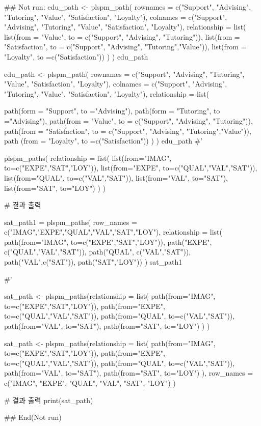 \documentclass[a4paper]{book}
\begin{document}
\begin{Examples}
\begin{ExampleCode}

## Not run: 
edu_path <- plspm_path(
  rownames = c("Support", "Advising", "Tutoring", "Value", "Satisfaction", "Loyalty"),
  colnames = c("Support", "Advising", "Tutoring", "Value", "Satisfaction", "Loyalty"),
  relationship = list(
    list(from = "Value",
         to = c("Support", "Advising", "Tutoring")),
    list(from = "Satisfaction",
         to = c("Support", "Advising", "Tutoring","Value")),
    list(from = "Loyalty",
         to =c("Satisfaction"))
  )
)
edu_path


edu_path <- plspm_path(
  rownames = c("Support", "Advising", "Tutoring", "Value", "Satisfaction", "Loyalty"),
  colnames = c("Support", "Advising", "Tutoring", "Value", "Satisfaction", "Loyalty"),
  relationship = list(

    path(form = "Support", to ="Advising"),
    path(form = "Tutoring", to ="Advising"),
    path(from = "Value",
         to = c("Support", "Advising", "Tutoring")),
    path(from = "Satisfaction",
         to = c("Support", "Advising", "Tutoring","Value")),
    path (from = "Loyalty",
         to =c("Satisfaction"))
  )
)
edu_path
#'

plspm_paths(
  relationship = list(
    list(from="IMAG", to=c("EXPE","SAT","LOY")),
    list(from="EXPE", to=c("QUAL","VAL","SAT")),
    list(from="QUAL", to=c("VAL","SAT")),
    list(from="VAL", to="SAT"),
    list(from="SAT", to="LOY")
  )
)

# 결과 출력

sat_path1 = plspm_paths(
  row_names = c("IMAG","EXPE","QUAL","VAL","SAT","LOY"),
  relationship = list(
    path(from="IMAG", to=c("EXPE","SAT","LOY")),
    path("EXPE", c("QUAL","VAL","SAT")),
    path("QUAL", c("VAL","SAT")),
    path("VAL",c("SAT")),
    path("SAT","LOY"))
)
sat_path1

#'

sat_path <- plspm_paths(relationship = list(
  path(from="IMAG", to=c("EXPE","SAT","LOY")),
  path(from="EXPE", to=c("QUAL","VAL","SAT")),
  path(from="QUAL", to=c("VAL","SAT")),
  path(from="VAL", to="SAT"),
  path(from="SAT", to="LOY")
) )

sat_path <- plspm_paths(relationship = list(
  path(from="IMAG", to=c("EXPE","SAT","LOY")),
  path(from="EXPE", to=c("QUAL","VAL","SAT")),
  path(from="QUAL", to=c("VAL","SAT")),
  path(from="VAL", to="SAT"),
  path(from="SAT", to="LOY")
),
row_names =  c("IMAG", "EXPE", "QUAL", "VAL", "SAT", "LOY")
)

# 결과 출력
print(sat_path)



## End(Not run)
\end{ExampleCode}
\end{Examples}
\end{document}
